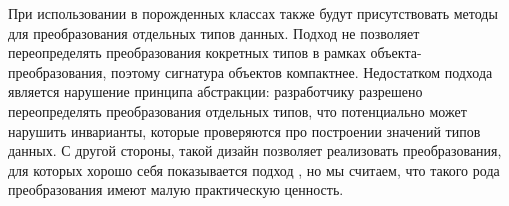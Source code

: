 При использовании \visitors{} в порожденных классах также будут присутствовать методы для преобразования отдельных типов данных. Подход \GT{} не позволяет переопределять преобразования кокретных типов в рамках объекта-преобразования, поэтому сигнатура объектов компактнее.
Недостатком подхода \visitors{} является нарушение принципа абстракции: разработчику разрешено переопределять преобразования отдельных типов, что потенциально может нарушить инварианты, которые проверяются про построении значений типов данных. С другой стороны, такой дизайн позволяет реализовать преобразования, для которых хорошо себя показывается подход \cite{SYB}, но мы считаем, что такого рода преобразования имеют малую практическую ценность.

